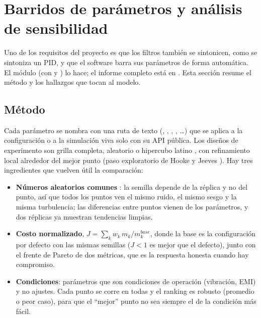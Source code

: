 \section{Barridos de parámetros y análisis de sensibilidad}
\label{sec:barridos}

Uno de los requisitos del proyecto es que los filtros también se sintonicen,
como se sintoniza un PID, y que el software barra sus parámetros de forma
automática. El
módulo  (con  y
) lo hace; el informe completo está en
. Esta sección resume el método y los hallazgos que
tocan al modelo.

\subsection{Método}

{\sloppy Cada parámetro se nombra con una ruta de texto (,
, ,
, \ldots) que se aplica a la configuración o a la
simulación viva solo con su API pública. Los diseños de experimento son
grilla completa, aleatorio o hipercubo latino \cite{mckay79}, con
refinamiento local alrededor del mejor punto (paso exploratorio de Hooke y
Jeeves \cite{hooke61}). Hay tres ingredientes que vuelven útil la
comparación:\par}

\begin{itemize}
\item \textbf{Números aleatorios comunes} \cite{lawkelton}: la semilla
depende de la réplica y no del punto, así que todos los puntos ven el mismo
ruido, el mismo sesgo y la misma turbulencia; las diferencias entre puntos
vienen de los parámetros, y dos réplicas ya muestran tendencias limpias.
\item \textbf{Costo normalizado}, $J=\sum_kw_k\,m_k/m_k^{base}$, donde la base
es la configuración por defecto con las mismas semillas ($J<1$ es mejor que
el defecto), junto con el frente de Pareto de dos métricas, que es la
respuesta honesta cuando hay compromiso.
\item \textbf{Condiciones}: parámetros que son condiciones de operación
(vibración, EMI) y no ajustes. Cada punto se corre en todas y el ranking es
robusto (promedio o peor caso), para que el ``mejor'' punto no sea siempre
el de la condición más fácil.
\end{itemize}

